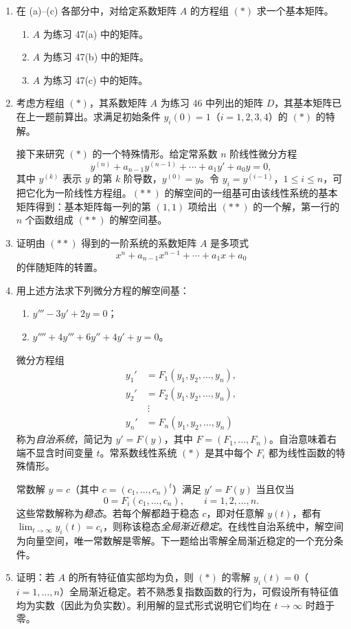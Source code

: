 \begin{enumerate}[label=\arabic*.]
\item 在 (a)--(c) 各部分中，对给定系数矩阵 $A$ 的方程组 $(*)$ 求一个基本矩阵。
\begin{enumerate}[label=(\alph*)]
\item $A$ 为练习 47(a) 中的矩阵。
\item $A$ 为练习 47(b) 中的矩阵。
\item $A$ 为练习 47(c) 中的矩阵。
\end{enumerate}

\item 考虑方程组 $(*)$，其系数矩阵 $A$ 为练习 46 中列出的矩阵 $D$，其基本矩阵已在上一题前算出。求满足初始条件 $y_i(0)=1$（$i=1,2,3,4$）的 $(*)$ 的特解。

接下来研究 $(*)$ 的一个特殊情形。给定常系数 $n$ 阶线性微分方程
\[
y^{(n)}+a_{n-1}y^{(n-1)}+\cdots+a_1y'+a_0y=0,\tag{$**$}
\]
其中 $y^{(k)}$ 表示 $y$ 的第 $k$ 阶导数，$y^{(0)}=y$。令 $y_i=y^{(i-1)}$，$1\leq i\leq n$，可把它化为一阶线性方程组。$(**)$ 的解空间的一组基可由该线性系统的基本矩阵得到：基本矩阵每一列的第 $(1,1)$ 项给出 $(**)$ 的一个解，第一行的 $n$ 个函数组成 $(**)$ 的解空间基。

\item 证明由 $(**)$ 得到的一阶系统的系数矩阵 $A$ 是多项式
\[
x^n+a_{n-1}x^{n-1}+\cdots+a_1x+a_0
\]
的伴随矩阵的转置。

\item 用上述方法求下列微分方程的解空间基：
\begin{enumerate}[label=(\alph*)]
\item $y'''-3y'+2y=0$；
\item $y''''+4y'''+6y''+4y'+y=0$。
\end{enumerate}

微分方程组
\[
\begin{aligned}
y_1'&=F_1(y_1,y_2,
\ldots,y_n),\\
y_2'&=F_2(y_1,y_2,
\ldots,y_n),\\
&\ \vdots\\
y_n'&=F_n(y_1,y_2,
\ldots,y_n)
\end{aligned}
\]
称为\emph{自治系统}，简记为 $y'=F(y)$，其中 $F=(F_1,
\ldots,F_n)$。自治意味着右端不显含时间变量 $t$。常系数线性系统 $(*)$ 是其中每个 $F_i$ 都为线性函数的特殊情形。

常数解 $y=c$（其中 $c=(c_1,
\ldots,c_n)^t$）满足 $y'=F(y)$ 当且仅当
\[
0=F_i(c_1,
\ldots,c_n),
\qquad i=1,2,
\ldots,n.
\]
这些常数解称为\emph{稳态}。若每个解都趋于稳态 $c$，即对任意解 $y(t)$，都有 $\lim_{t\to\infty}y_i(t)=c_i$，则称该稳态\emph{全局渐近稳定}。在线性自治系统中，解空间为向量空间，唯一常数解是零解。下一题给出零解全局渐近稳定的一个充分条件。

\item 证明：若 $A$ 的所有特征值实部均为负，则 $(*)$ 的零解 $y_i(t)=0$（$i=1,
\ldots,n$）全局渐近稳定。若不熟悉复指数函数的行为，可假设所有特征值均为实数（因此为负实数）。利用解的显式形式说明它们均在 $t\to\infty$ 时趋于零。
\end{enumerate}
